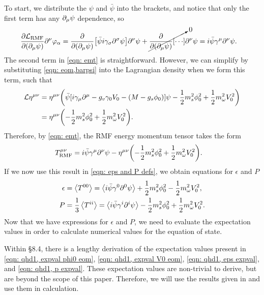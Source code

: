 To start, we distribute the $\psi$ and $\bar\psi$ into the brackets, and notice that only the first term has any $\partial_\mu \psi$ dependence, so
\begin{align}
    \pdv{\Lag_\text{RMF}}{(\p_\mu \psi)} \p^\nu \varphi_\alpha & = \pdv{(\p_\mu \psi)}\bqty{\bar\psi i \gamma_\sigma \p^\sigma\psi}\p^\nu \psi + \cancelto{0}{\pdv{(\p_\mu \psi)}\bqty{\cdots}} \p^\nu \psi = i\bar\psi\gamma^\mu \p^\nu \psi.
\end{align}
The second term in \eqref{eqn: emt} is straightforward. However, we can simplify by substituting \eqref{eqn: eom,barpsi} into the Lagrangian density when we form this term, such that
\begin{align}
    \Lag \eta^{\mu\nu} &= \eta^{\mu\nu}\pqty{\bar\psi \bqty{i\gamma_\mu\p^\mu - g_v \gamma_0 V_0 - (M-g_s\phi_0)} \psi - \frac{1}{2} m_s^2 \phi_0^2 + \frac{1}{2} m_\omega^2 V_0^2}\nonumber\\
    & = \eta^{\mu\nu} \pqty{- \frac{1}{2} m_s^2 \phi_0^2 + \frac{1}{2} m_\omega^2 V_0^2}.
\end{align}
Therefore, by \eqref{eqn: emt}, the RMF energy momentum tensor takes the form
\begin{align}
    T^{\mu\nu}_\text{RMF} & =i\bar\psi\gamma^\mu \p^\nu \psi - \eta^{\mu\nu} \pqty{- \frac{1}{2} m_s^2 \phi_0^2 + \frac{1}{2} m_\omega^2 V_0^2}.
\end{align}
If we now use this result in \eqref{eqn: eps and P defs}, we obtain equations for $\epsilon$ and $P$
\begin{align}
    \epsilon & = \expval{T^{00}} = \expval{i\bar\psi\gamma^0 \partial^0 \psi} + \frac{1}{2} m_s^2 \phi_0^2 - \frac{1}{2} m_\omega^2 V_0^2,\label{eqn: qhd1, eps expval}\\
    P &= \frac{1}{3}\expval{T^{ii}} = \expval{i\bar\psi\gamma^i \partial^i \psi}  - \frac{1}{2} m_s^2 \phi_0^2 + \frac{1}{2} m_\omega^2 V_0^2. \label{eqn: qhd1, p expval}
\end{align}
Now that we have expressions for $\epsilon$ and $P$, we need to evaluate the expectation values in order to calculate numerical values for the equation of state.

Within \autocite{diener_2008} \S 8.4, there is a lengthy derivation of the expectation values present in \eqref{eqn: qhd1, expval phi0 eom}, \eqref{eqn: qhd1, expval V0 eom}, \eqref{eqn: qhd1, eps expval}, and \eqref{eqn: qhd1, p expval}. These expectation values are non-trivial to derive, but are beyond the scope of this paper. Therefore, we will use the results given in \autocite{diener_2008} and use them in calculation.

